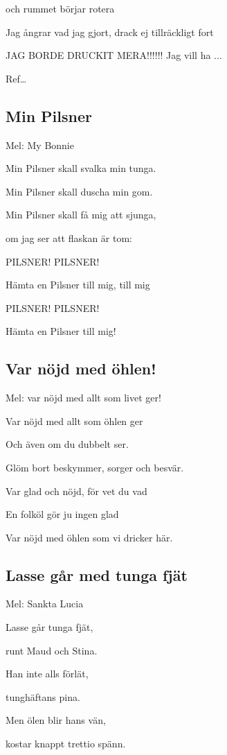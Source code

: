och rummet börjar rotera

Jag ångrar vad jag gjort, drack ej tillräckligt fort

JAG BORDE DRUCKIT MERA!!!!!! Jag vill ha ...\bigskip

Ref… \bigskip

\subsection{\textbf{Min Pilsner}}

Mel: My Bonnie\bigskip

Min Pilsner skall svalka min tunga.

Min Pilsner skall duscha min gom.

Min Pilsner skall få mig att sjunga,

om jag ser att flaskan är tom:

PILSNER! PILSNER!

Hämta en Pilsner till mig, till mig

PILSNER! PILSNER!

Hämta en Pilsner till mig! 
\subsection{\textbf{Var nöjd med öhlen!}}

Mel: var nöjd med allt som livet ger!\bigskip

Var nöjd med allt som öhlen ger

Och även om du dubbelt ser.

Glöm bort beskymmer, sorger och besvär.

Var glad och nöjd, för vet du vad

En folköl gör ju ingen glad

Var nöjd med öhlen som vi dricker här. 

\subsection{\textbf{Lasse går med tunga fjät}}

Mel: Sankta Lucia \bigskip

Lasse går tunga fjät,

runt Maud och Stina.

Han inte alls förlät,

tunghäftans pina.

Men ölen blir hans vän,

kostar knappt trettio spänn.

